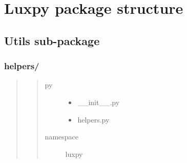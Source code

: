 \documentclass[letterpaper,10pt,english]{sphinxmanual}
\begin{document}
\chapter{Luxpy package structure}
\label{\detokenize{luxpy_structure::doc}}\label{\detokenize{luxpy_structure:luxpy-package-structure}}

\section{Utils sub-package}
\label{\detokenize{utils::doc}}\label{\detokenize{utils:utils-sub-package}}

\subsection{helpers/}
\label{\detokenize{utils:helpers}}\begin{quote}
\begin{quote}\begin{description}
\item[{py}] \leavevmode\begin{itemize}
\item {} 
\_\_init\_\_.py

\item {} 
helpers.py

\end{itemize}

\item[{namespace}] \leavevmode
luxpy

\end{description}\end{quote}
\end{quote}
\label{\detokenize{utils:module-luxpy.utils.helpers}}
\end{document}
